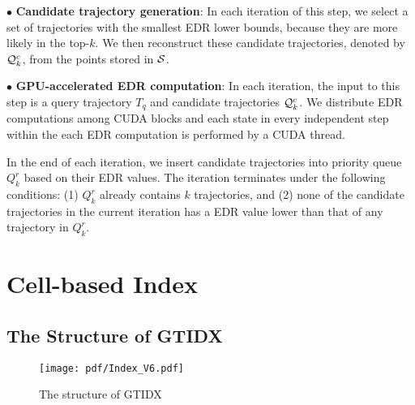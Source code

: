 \documentclass[10pt,conference,letterpaper]{IEEEtran}
\newcommand{\idxname}{GTIDX\xspace }
\newcommand{\simcand}{{{\cal Q}_k^c}\xspace}
\newcommand{\trajtable}{{\cal S}\xspace}
\begin{document}
\vspace{0.1cm}$\bullet$ {\bf Candidate trajectory generation}:
In each iteration of this step, we select a set of trajectories with the smallest EDR lower bounds, because they are more likely in the top-$k$. We then reconstruct these candidate trajectories, denoted by $\simcand$, from the points stored in $\trajtable$.

\vspace{0.1cm}$\bullet$ {\bf GPU-accelerated EDR computation}:
In each iteration, the input to this step is a query trajectory $T_q$ and candidate trajectories $\simcand$. We distribute EDR computations among CUDA blocks and each state in every independent step within the each EDR computation is performed by a CUDA thread.

In the end of each iteration, we insert candidate trajectories into priority queue $Q_{k}^r$ based on their EDR values. The iteration terminates under the following conditions: (1) $Q_{k}^r$ already contains $k$ trajectories, and (2) none of the candidate trajectories in the current iteration has a EDR value lower than that of any trajectory in $Q_{k}^r$.




\section{Cell-based Index}\label{sec:index}


\subsection{The Structure of \idxname}

\begin{figure}[t]
	\centering
	\texttt{[image: pdf/Index\_V6.pdf]}
	\vspace{-.2in}
	\caption{The structure of \idxname \label{fig:Index}}
	\vspace{-.1in}
\end{figure}

\end{document}
